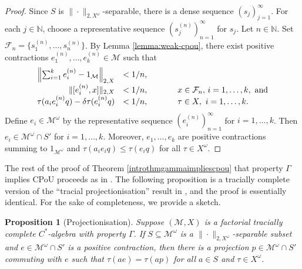 \documentclass[a4paper,11pt]{amsart}
\newtheorem{proposition}[theorem]{Proposition}
\theoremstyle{definition}
\numberwithin{equation}{section}
\numberwithin{theorem}{section}
\newcommand{\F}{\mathcal F}
\newcommand{\N}{\mathbb N}
\newcommand{\M}{\mathcal{M}}
\begin{document}
\begin{proof}
    Since $S$ is  $\|\cdot\|_{2, X^\omega}$-separable, there is a dense sequence $(s_j)_{j=1}^\infty$.
    For each $j \in \N$, choose a representative sequence $(s_j^{(n)})_{n=1}^\infty$ for $s_j$. 
    Let $n \in \N$. Set $\F_n = \{s_1^{(n)}, \ldots,s_n^{(n)}\}$.
    By Lemma \ref{lemma:weak-cpou}, there exist positive contractions $e_1^{(n)},\ldots,e_k^{(n)} \in \M$ such that
     \begin{equation}\begin{array}{rlrl}
		\left\|\sum_{i=1}^k e_i^{(n)} - 1_\M\right\|_{2,X} &< 1/n,  && \\
        \|[e_i^{(n)},x]\|_{2,X} &< 1/n, &&x \in \F_n, \, i = 1, \ldots, k,\ \text{and}  \\
		\tau(a_i e_i^{(n)} q) - \delta \tau(e_i^{(n)} q) &< 1/n, & \hspace{4ex}& \tau \in X,\ i = 1, \ldots, k. 
    \end{array}\end{equation}
    Define $e_i \in \M^\omega$ by the representative sequence $(e_i^{(n)})_{n=1}^\infty$ for $i=1,\ldots,k$.
    Then $e_i \in \M^\omega \cap S'$ for $i=1,\ldots,k$. Moreover, $e_1, \ldots, e_k$ are positive contractions summing to $1_{\M^\omega}$ and $\tau(a_ie_iq) \leq \tau(e_iq)$ for all $\tau \in X^\omega.$
\end{proof}

The rest of the proof of Theorem \ref{introthmgammaimpliescpou} that property $\Gamma$ implies CPoU proceeds as in \cite{CETWW}.  The following proposition  is a tracially complete version of the ``tracial projectionisation'' result in \cite[Lemma~2.4]{CETWW}, and the proof is essentially identical.  For the sake of completeness, we provide a sketch.

\begin{proposition}[Projectionisation]\label{prop:projectionisation}
	Suppose $(\M, X)$ is a factorial tracially complete $C^*$-algebra with property $\Gamma$.  If $S \subseteq \M^\omega$ is a $\|\cdot\|_{2, X^\omega}$-separable subset and $e \in \M^\omega \cap S'$ is a positive contraction, then there is a projection $p \in \M^\omega \cap S'$ commuting with $e$ such that $\tau(ae) = \tau(ap)$ for all $a \in S$ and $\tau \in X^\omega$.
\end{proposition}
\end{document}

